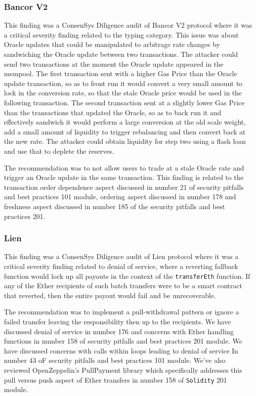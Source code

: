 \subsubsection{Bancor V2}\label{bancor-v2}

This finding was a ConsenSys Diligence audit of Bancor V2 protocol where
it was a critical severity finding related to the typing category. This
issue was about Oracle updates that could be manipulated to arbitrage
rate changes by sandwiching the Oracle update between two transactions.
The attacker could send two transactions at the moment the Oracle update
appeared in the mempool. The first transaction sent with a higher Gas
Price than the Oracle update transaction, so as to front run it would
convert a very small amount to lock in the conversion rate, so that the
stale Oracle price would be used in the following transaction. The
second transaction sent at a slightly lower Gas Price than the
transactions that updated the Oracle, so as to back run it and
effectively sandwich it would perform a large conversion at the old
scale weight, add a small amount of liquidity to trigger rebalancing and
then convert back at the new rate. The attacker could obtain liquidity
for step two using a flash loan and use that to deplete the reserves.

The recommendation was to not allow users to trade at a stale Oracle
rate and trigger an Oracle update in the same transaction. This finding
is related to the transaction order dependence aspect discussed in
number 21 of security pitfalls and best practices 101 module, ordering
aspect discussed in number 178 and freshness aspect discussed in number
185 of the security pitfalls and best practices 201.

\subsubsection{Lien}\label{lien}

This finding was a ConsenSys Diligence audit of Lien protocol where it
was a critical severity finding related to denial of service, where a
reverting fallback function would lock up all payouts in the context of
the \texttt{transferEth} function. If any of the Ether recipients of
such batch transfers were to be a smart contract that reverted, then the
entire payout would fail and be unrecoverable.

The recommendation was to implement a pull-withdrawal pattern or ignore
a failed transfer leaving the responsibility then up to the recipients.
We have discussed denial of service in number 176 and concerns with
Ether handling functions in number 158 of security pitfalls and best
practices 201 module. We have discussed concerns with calls within loops
leading to denial of service In number 43 oF security pitfalls and best
practices 101 module. We've also reviewed OpenZeppelin's PullPayment
library which specifically addresses this pull versus push aspect of
Ether transfers in number 158 of \texttt{Solidity} 201 module.


